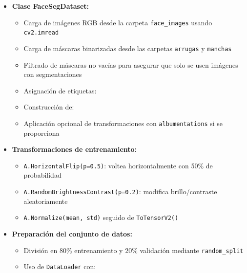 \begin{enumerate}
\begin{itemize}
\begin{itemize}
      \item \textbf{Clase FaceSegDataset:}
      \begin{itemize}
        \item Carga de imágenes RGB desde la carpeta \texttt{face\_images} usando \texttt{cv2.imread}
        \item Carga de máscaras binarizadas desde las carpetas \texttt{arrugas} y \texttt{manchas}
        \item Filtrado de máscaras no vacías para asegurar que solo se usen imágenes con segmentaciones
        \item Asignación de etiquetas:
        \item Construcción de:
        \item Aplicación opcional de transformaciones con \texttt{albumentations} si se proporciona
      \end{itemize}
  
      \item \textbf{Transformaciones de entrenamiento:}
      \begin{itemize}
        \item \texttt{A.HorizontalFlip(p=0.5)}: voltea horizontalmente con 50\% de probabilidad
        \item \texttt{A.RandomBrightnessContrast(p=0.2)}: modifica brillo/contraste aleatoriamente
        \item \texttt{A.Normalize(mean, std)} seguido de \texttt{ToTensorV2()}
      \end{itemize}
  
      \item \textbf{Preparación del conjunto de datos:}
      \begin{itemize}
        \item División en 80\% entrenamiento y 20\% validación mediante \texttt{random\_split}
        \item Uso de \texttt{DataLoader} con:
      \end{itemize}
  

\end{itemize}
\end{itemize}
\end{enumerate}
